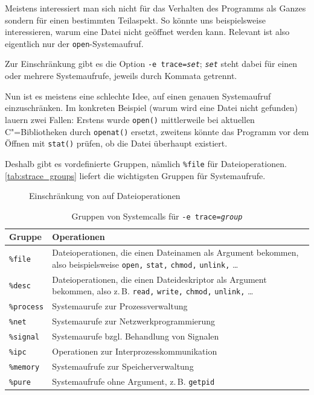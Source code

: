 Meistens interessiert man sich nicht für das Verhalten des Programms als Ganzes sondern für einen
bestimmten Teilaspekt. So könnte uns beispielsweise interessieren, warum eine Datei nicht geöffnet
werden kann. Relevant ist also eigentlich nur der \texttt{open}-Systemaufruf.

Zur Einschränkung gibt es die Option \texttt{-e trace=\emph{set}}; \texttt{\emph{set}}
steht dabei für einen oder mehrere Systemaufrufe, jeweils durch Kommata getrennt.

Nun ist es meistens eine schlechte Idee, \strace{} auf einen genauen Systemaufruf einzuschränken.
Im konkreten Beispiel (warum wird eine Datei nicht gefunden) lauern zwei Fallen: Erstens wurde
\texttt{open()} mittlerweile bei aktuellen C"=Bibliotheken durch \texttt{openat()} ersetzt, zweitens
könnte das Programm vor dem Öffnen mit \texttt{stat()} prüfen, ob die Datei überhaupt existiert.

Deshalb gibt es vordefinierte Gruppen, nämlich \texttt{\%file} für Dateioperationen.
\autoref{tab:strace_groups} liefert die wichtigsten Gruppen für Systemaufrufe.


\begin{figure}[tb]
  
  \caption{Einschränkung von \strace{} auf Dateioperationen}
  \label{fig:fileonly}
\end{figure}


\begin{table}[htb]
  \centering\small
  \begin{tabular}{|lp{6cm}|}
    \hline
    \textbf{Gruppe} & \textbf{Operationen} \\
    \hline
    \texttt{\%file}          & Dateioperationen, die einen Dateinamen als Argument
                               bekommen, also beispielsweise \texttt{open,} \texttt{stat,}
                               \texttt{chmod,} \texttt{unlink,} … \\
    \texttt{\%desc}          & Dateioperationen, die einen Dateideskriptor als Argument
                               bekommen, also z.\,B. \texttt{read,} \texttt{write,}
                               \texttt{chmod,} \texttt{unlink,} … \\
    \texttt{\%process}       & Systemaurufe zur Prozessverwaltung \\
    \texttt{\%net}           & Systemaurufe zur Netzwerkprogrammierung \\
    \texttt{\%signal}        & Systemaurufe bzgl. Behandlung von Signalen \\
    \texttt{\%ipc}           & Operationen zur Interprozesskommunikation \\
    \texttt{\%memory}        & Systemaufrufe zur Speicherverwaltung \\
    \texttt{\%pure}          & Systemaufrufe ohne Argument, z.\,B. \texttt{getpid} \\
    \hline
  \end{tabular}
  \caption{Gruppen von Systemcalls für \texttt{-e trace=\emph{group}}}
  \label{tab:strace_groups}
\end{table}

